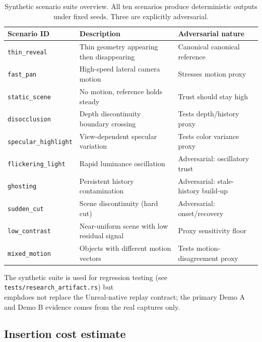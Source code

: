 \documentclass[11pt,letterpaper]{article}
\theoremstyle{gcresult}
\theoremstyle{definition}
\begin{document}
\begin{table}[H]
\centering
\caption{Synthetic scenario suite overview. All ten scenarios produce deterministic outputs under fixed seeds. Three are explicitly adversarial.}
\label{tab:scenario-suite}
\small
\begin{tabular}{>{\raggedright\arraybackslash}p{3.0cm} >{\raggedright\arraybackslash}p{5.5cm} >{\raggedright\arraybackslash}p{4.0cm}}
\toprule
Scenario ID & Description & Adversarial nature \\
\midrule
\texttt{thin\_reveal} & Thin geometry appearing then disappearing & Canonical canonical reference \\
\texttt{fast\_pan} & High-speed lateral camera motion & Stresses motion proxy \\
\texttt{static\_scene} & No motion, reference holds steady & Trust should stay high \\
\texttt{disocclusion} & Depth discontinuity boundary crossing & Tests depth/history proxy \\
\texttt{specular\_highlight} & View-dependent specular variation & Tests color variance proxy \\
\texttt{flickering\_light} & Rapid luminance oscillation & Adversarial: oscillatory trust \\
\texttt{ghosting} & Persistent history contamination & Adversarial: stale-history build-up \\
\texttt{sudden\_cut} & Scene discontinuity (hard cut) & Adversarial: onset/recovery \\
\texttt{low\_contrast} & Near-uniform scene with low residual signal & Proxy sensitivity floor \\
\texttt{mixed\_motion} & Objects with different motion vectors & Tests motion-disagreement proxy \\
\bottomrule
\end{tabular}
\end{table}

The synthetic suite is used for regression testing (see \texttt{tests/research\_artifact.rs}) but \\emph{does not replace} the Unreal-native replay contract; the primary Demo A and Demo B evidence comes from the real captures only.

\subsection{Insertion cost estimate}
\label{sec:insertion-cost}
\end{document}
